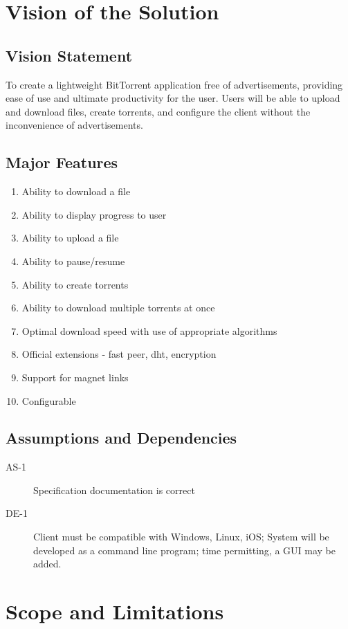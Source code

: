 \documentclass[letter]{scrartcl}
\begin{document}
\section{Vision of the Solution}
\subsection{Vision Statement}
To create a lightweight BitTorrent application free of advertisements, providing ease of use and ultimate productivity for the user.  Users will be able to upload and download files, create torrents, and configure the client without the inconvenience of advertisements.
\subsection{Major Features}
\begin{enumerate}
\item Ability to download a file
\item Ability to display progress to user
\item Ability to upload a file
\item Ability to pause/resume
\item Ability to create torrents
\item Ability to download multiple torrents at once
\item Optimal download speed with use of appropriate algorithms
\item Official extensions - fast peer, dht, encryption
\item Support for magnet links
\item Configurable
\end{enumerate}

\subsection{Assumptions and Dependencies}
\begin{description}
\item[AS-1] Specification documentation is correct
\item[DE-1] Client must be compatible with Windows, Linux, iOS;
System will be developed as a command line program; time permitting, a GUI may be added.
\end{description}

\section{Scope and Limitations}
\end{document}
